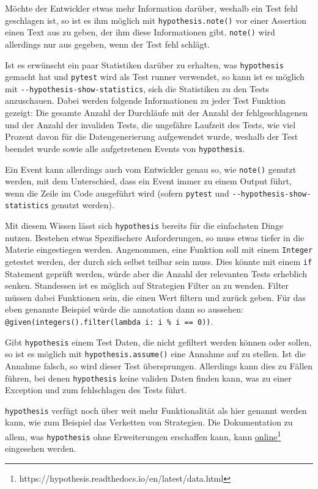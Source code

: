 Möchte der Entwickler etwas mehr Information darüber, weshalb ein Test fehl 
geschlagen ist, so ist es ihm möglich mit \lstinline{hypothesis.note()} vor 
einer Assertion einen Text aus zu geben, der ihm diese Informationen gibt. 
\lstinline{note()} wird
allerdings nur aus gegeben, wenn der Test fehl schlägt.

Ist es erwünscht ein paar Statistiken darüber zu erhalten, was 
\lstinline{hypothesis} gemacht hat und \lstinline{pytest} wird als Test runner 
verwendet, so kann ist es möglich mit \lstinline{--hypothesis-show-statistics}, 
sich die Statistiken zu den Tests anzuschauen. Dabei werden folgende 
Informationen zu jeder Test Funktion gezeigt: Die gesamte Anzahl der Durchläufe 
mit der Anzahl der fehlgeschlagenen und der Anzahl der invaliden Tests, die 
ungefähre Laufzeit des Tests, wie viel Prozent davon für die Datengenerierung 
aufgewendet wurde, weshalb der Test beendet wurde sowie alle aufgetretenen 
Events von \lstinline{hypothesis}.

Ein Event kann allerdings auch vom Entwickler genau so, wie \lstinline{note()} 
genutzt werden, mit dem Unterschied, dass ein Event immer zu einem Output 
führt, wenn die Zeile im Code ausgeführt wird (sofern \lstinline{pytest} und 
\lstinline{--hypothesis-show-statistics} genutzt werden).

Mit diesem Wissen lässt sich \lstinline{hypothesis} bereits für die einfachsten 
Dinge nutzen. Bestehen etwas Spezifischere Anforderungen, so muss etwas tiefer
in die Materie eingestiegen werden. Angenommen, eine Funktion soll mit einem
\lstinline{Integer} getestet werden, der durch sich selbst teilbar sein muss.
Dies könnte mit einem \lstinline{if} Statement geprüft werden, würde aber die 
Anzahl der relevanten Tests erheblich senken. Standessen ist es möglich auf 
Strategien Filter an zu wenden. Filter müssen dabei Funktionen sein, die einen 
Wert filtern und zurück geben. Für das eben genannte Beispiel würde die 
\Gls{annotation} dann so aussehen:
\lstinline{@given(integers().filter(lambda i: i % i == 0))}.

Gibt \lstinline{hypothesis} einem Test Daten, die nicht gefiltert werden können 
oder sollen, so ist es möglich mit \lstinline{hypothesis.assume()} eine Annahme 
auf zu stellen. Ist die Annahme falsch, so wird dieser Test übersprungen. 
Allerdings kann dies zu Fällen führen, bei denen \lstinline{hypothesis} keine 
validen Daten finden kann, was zu einer Exception und zum fehlschlagen des 
Tests führt.

\lstinline{hypothesis} verfügt noch über weit mehr Funktionalität als hier 
genannt werden kann, wie zum Beispiel das Verketten von Strategien. Die 
Dokumentation zu allem, was \lstinline{hypothesis} ohne Erweiterungen 
erschaffen kann, kann 
\href{https://hypothesis.readthedocs.io/en/latest/data.html}{online}\footnote{https://hypothesis.readthedocs.io/en/latest/data.html}
eingesehen werden.

